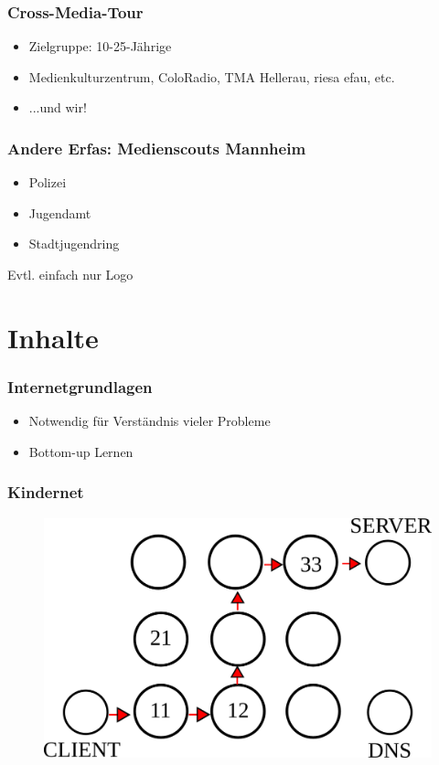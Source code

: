 \documentclass[12pt]{beamer}
\begin{document}
\begin{frame}
  \frametitle{Cross-Media-Tour}
  \begin{itemize}
    \item Zielgruppe: 10-25-Jährige
    \item Medienkulturzentrum, ColoRadio, TMA Hellerau, riesa efau, etc.
    \item ...und wir!
  \end{itemize}
\end{frame}

\begin{frame}
  \frametitle{Andere Erfas: Medienscouts Mannheim}
  \begin{itemize}
    \item Polizei
    \item Jugendamt
    \item Stadtjugendring
  \end{itemize}
  Evtl. einfach nur Logo
\end{frame}

\section{Inhalte}

\begin{frame}
  \frametitle{Internetgrundlagen}
  \begin{itemize}
    \item Notwendig für Verständnis vieler Probleme
    \item Bottom-up Lernen
  \end{itemize}
\end{frame}

\begin{frame}
  \frametitle{Kindernet}
  \begin{figure}
    \includegraphics[height=0.7\textheight]{img/kindernet.png}
  \end{figure}
\end{frame}
\end{document}
